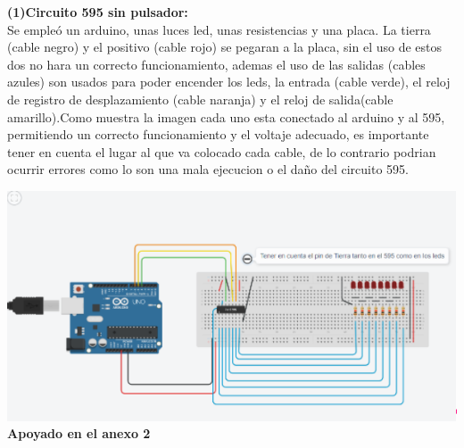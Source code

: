 \documentclass{article}
\begin{document}
\begin{justify}


\textbf{(1)Circuito 595 sin pulsador:}\\
Se empleó un arduino, unas luces led, unas resistencias y una placa. La tierra (cable negro) y el positivo (cable rojo) se pegaran a la placa, sin el uso de estos dos no hara un correcto funcionamiento, ademas el uso de las salidas (cables azules) son usados para poder encender los leds, la entrada (cable verde), el reloj de registro de desplazamiento (cable naranja) y el reloj de salida(cable amarillo).Como muestra la imagen cada uno esta conectado al arduino y al 595, permitiendo un correcto funcionamiento y el voltaje adecuado, es importante tener en cuenta el lugar al que va colocado cada cable, de lo contrario podrian ocurrir errores como lo son una mala ejecucion o el daño del circuito 595.
\end{justify}

\includegraphics[scale=0.5]{figura3.png}
\centering
\textbf{Apoyado en el anexo 2}
\newline
\newline
\newline
\end{document}
